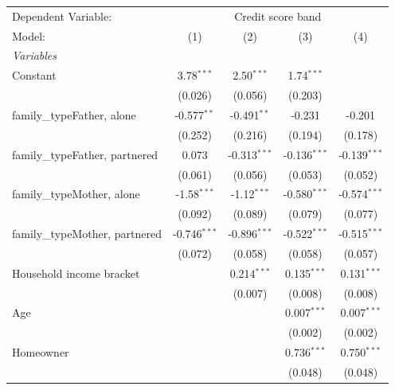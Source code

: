 
\begingroup
\centering
\begin{tabular}{lcccc}
   \tabularnewline \midrule \midrule
   Dependent Variable: & \multicolumn{4}{c}{Credit score band}\\
   Model:                         & (1)            & (2)            & (3)            & (4)\\  
   \midrule
   \emph{Variables}\\
   Constant                       & 3.78$^{***}$   & 2.50$^{***}$   & 1.74$^{***}$   &   \\   
                                  & (0.026)        & (0.056)        & (0.203)        &   \\   
   family\_typeFather, alone      & -0.577$^{**}$  & -0.491$^{**}$  & -0.231         & -0.201\\   
                                  & (0.252)        & (0.216)        & (0.194)        & (0.178)\\   
   family\_typeFather, partnered  & 0.073          & -0.313$^{***}$ & -0.136$^{***}$ & -0.139$^{***}$\\   
                                  & (0.061)        & (0.056)        & (0.053)        & (0.052)\\   
   family\_typeMother, alone      & -1.58$^{***}$  & -1.12$^{***}$  & -0.580$^{***}$ & -0.574$^{***}$\\   
                                  & (0.092)        & (0.089)        & (0.079)        & (0.077)\\   
   family\_typeMother, partnered  & -0.746$^{***}$ & -0.896$^{***}$ & -0.522$^{***}$ & -0.515$^{***}$\\   
                                  & (0.072)        & (0.058)        & (0.058)        & (0.057)\\   
   Household income bracket       &                & 0.214$^{***}$  & 0.135$^{***}$  & 0.131$^{***}$\\   
                                  &                & (0.007)        & (0.008)        & (0.008)\\   
   Age                            &                &                & 0.007$^{***}$  & 0.007$^{***}$\\   
                                  &                &                & (0.002)        & (0.002)\\   
   Homeowner                      &                &                & 0.736$^{***}$  & 0.750$^{***}$\\   
                                  &                &                & (0.048)        & (0.048)\\   

\end{tabular}
